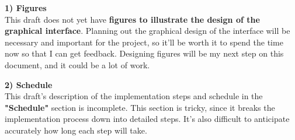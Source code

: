 \textbf{1) Figures}
\\ This draft does not yet have \textbf{figures to illustrate the design of the graphical interface}.
Planning out the graphical design of the interface will be necessary and important for the project, so it'll be worth it to spend the time now so that I can get feedback.
Designing figures will be my next step on this document, and it could be a lot of work.

\textbf{2) Schedule}
\\ This draft's description of the implementation steps and schedule in the \textbf{"Schedule"} section is incomplete.
This section is tricky, since it breaks the implementation process down into detailed steps.
It's also difficult to anticipate accurately how long each step will take.

\newpage



